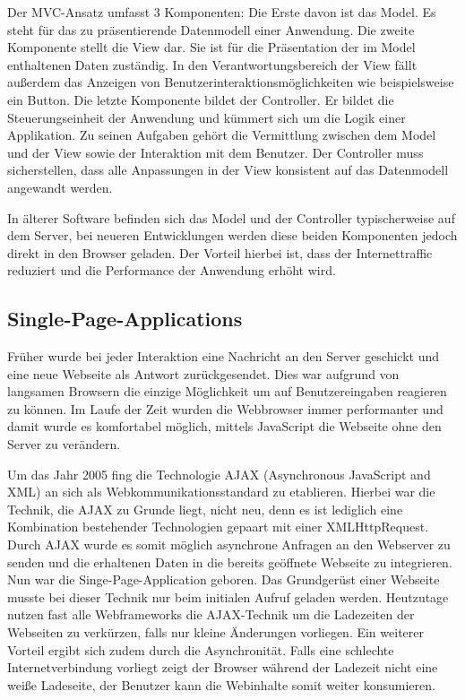 Der MVC-Ansatz umfasst 3 Komponenten: Die Erste davon ist das Model. Es steht für das zu präsentierende Datenmodell einer Anwendung. Die zweite Komponente stellt die View dar. Sie ist für die Präsentation der im Model enthaltenen Daten zuständig. In den Verantwortungsbereich der View fällt außerdem das Anzeigen von Benutzerinteraktionsmöglichkeiten wie beispielsweise ein Button. Die letzte Komponente bildet der Controller. Er bildet die Steuerungseinheit der Anwendung und kümmert sich um die Logik einer Applikation. Zu seinen Aufgaben gehört die Vermittlung zwischen dem Model und der View sowie der Interaktion mit dem Benutzer. Der Controller muss sicherstellen, dass alle Anpassungen in der View konsistent auf das Datenmodell angewandt werden.\autocites[vgl.][7\psqq]{Magnucki2017}

In älterer Software befinden sich das Model und der Controller typischerweise auf dem Server, bei neueren Entwicklungen werden diese beiden Komponenten jedoch direkt in den Browser geladen. Der Vorteil hierbei ist, dass der Internettraffic reduziert und die Performance der Anwendung erhöht wird.\autocites[vgl.][7\psqq]{Steyer2017}

\subsection{Single-Page-Applications}

Früher wurde bei jeder Interaktion eine Nachricht an den Server geschickt und eine neue Webseite als Antwort zurückgesendet. Dies war aufgrund von langsamen Browsern die einzige Möglichkeit um auf Benutzereingaben reagieren zu können. Im Laufe der Zeit wurden die Webbrowser immer performanter und damit wurde es komfortabel möglich, mittels JavaScript die Webseite ohne den Server zu verändern. 

Um das Jahr 2005 fing die Technologie AJAX (Asynchronous JavaScript and XML) an sich als Webkommunikationsstandard zu etablieren. Hierbei war die Technik, die AJAX zu Grunde liegt, nicht neu, denn es ist lediglich eine Kombination bestehender Technologien gepaart mit einer XMLHttpRequest. Durch AJAX wurde es somit möglich asynchrone Anfragen an den Webserver zu senden und die erhaltenen Daten in die bereits geöffnete Webseite zu integrieren. Nun war die Singe-Page-Application geboren. Das Grundgerüst einer Webseite musste bei dieser Technik nur beim initialen Aufruf geladen werden. Heutzutage nutzen fast alle Webframeworks die AJAX-Technik um die Ladezeiten der Webseiten zu verkürzen, falls nur kleine Änderungen vorliegen. Ein weiterer Vorteil ergibt sich zudem durch die Asynchronität. Falls eine schlechte Internetverbindung vorliegt zeigt der Browser während der Ladezeit nicht eine weiße Ladeseite, der Benutzer kann die Webinhalte somit weiter konsumieren.\autocites[vgl.][4]{Fink2014}[vgl.][7\psqq]{Jaeger2008}

